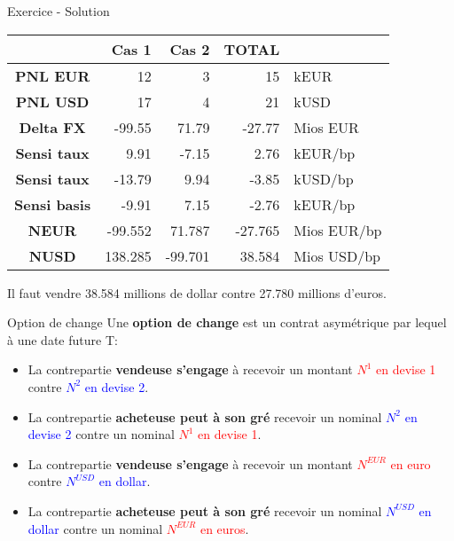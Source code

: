 \documentclass{beamer}
\begin{document}
\begin{frame}{Exercice - Solution}
\begin{center}
\begin{tabular}{|c|r|r|r|l|}
\hline
&\textbf{Cas 1}&\textbf{Cas 2}&\textbf{TOTAL}& \\
\hline
\hline
\textbf{PNL EUR} &12&3&15&kEUR\\
\textbf{PNL USD} &17&4&21&kUSD\\
\hline
\hline
\textbf{Delta FX} &-99.55&71.79&-27.77&Mios EUR\\
\textbf{Sensi taux} &9.91&-7.15&2.76&kEUR/bp\\
\textbf{Sensi taux} &-13.79&9.94&-3.85&kUSD/bp\\
\textbf{Sensi basis} &-9.91&7.15&-2.76&kEUR/bp\\
\hline
\hline
\textbf{NEUR} &-99.552&71.787&-27.765&Mios EUR/bp\\
\textbf{NUSD} &138.285&-99.701&38.584&Mios USD/bp\\
\hline
\end{tabular}
\end{center}
Il faut vendre 38.584 millions de dollar contre 27.780 millions d'euros.
\end{frame}

\begin{frame}{Option de change}
Une \textbf{option de change} est un contrat asymétrique par lequel à une date future T:\\
\vspace{0.5cm}
\begin{overprint}
\begin{itemize}
\item La contrepartie \textbf{vendeuse s'engage} à recevoir un montant \textcolor{red}{$N^1$ en devise 1} contre \textcolor{blue}{$N^2$ en devise 2}.
\item La contrepartie \textbf{acheteuse peut à son gré} recevoir un nominal \textcolor{blue}{$N^2$ en devise 2} contre un nominal \textcolor{red}{$N^1$ en devise 1}.
\end{itemize}
\begin{itemize}
\item La contrepartie \textbf{vendeuse s'engage} à recevoir un montant \textcolor{red}{$N^{EUR}$ en euro} contre \textcolor{blue}{$N^{USD}$ en dollar}.
\item La contrepartie \textbf{acheteuse peut à son gré} recevoir un nominal \textcolor{blue}{$N^{USD}$ en dollar} contre un nominal \textcolor{red}{$N^{EUR}$ en euros}.
\end{itemize}
\end{overprint}
\end{frame}
\end{document}
